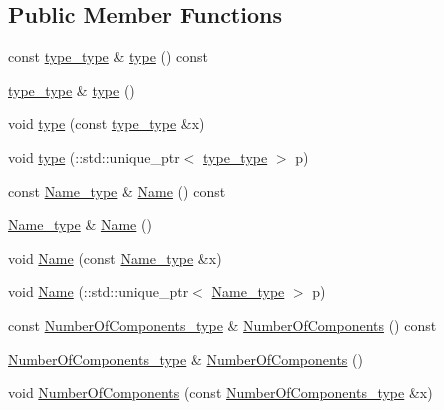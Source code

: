 \subsection*{Public Member Functions}
\begin{DoxyCompactItemize}
\item 
const \hyperlink{classDataArray__t_a484a0509e4f141d9970d75881703a51e}{type\+\_\+type} \& \hyperlink{classDataArray__t_a6ec3c246d1a2fddc7052bcde2cb6bdf7}{type} () const 
\item 
\hyperlink{classDataArray__t_a484a0509e4f141d9970d75881703a51e}{type\+\_\+type} \& \hyperlink{classDataArray__t_a29f3ed42a5bf8df9437ece5f63c02301}{type} ()
\item 
void \hyperlink{classDataArray__t_ae4fd6c47e992055ec42cc1949b60da2a}{type} (const \hyperlink{classDataArray__t_a484a0509e4f141d9970d75881703a51e}{type\+\_\+type} \&x)
\item 
void \hyperlink{classDataArray__t_a271b76368e9e5331b27c896a7ce9dda7}{type} (\+::std\+::unique\+\_\+ptr$<$ \hyperlink{classDataArray__t_a484a0509e4f141d9970d75881703a51e}{type\+\_\+type} $>$ p)
\item 
const \hyperlink{classDataArray__t_afc6836923916c2489f91caea78ec4ad6}{Name\+\_\+type} \& \hyperlink{classDataArray__t_ada03ebff820f73d64d0761a0fb977527}{Name} () const 
\item 
\hyperlink{classDataArray__t_afc6836923916c2489f91caea78ec4ad6}{Name\+\_\+type} \& \hyperlink{classDataArray__t_aeb126f8a8b03eea44eed5a2b606da59c}{Name} ()
\item 
void \hyperlink{classDataArray__t_a95a1f49a6dd9f54fb71fb6b70240a51b}{Name} (const \hyperlink{classDataArray__t_afc6836923916c2489f91caea78ec4ad6}{Name\+\_\+type} \&x)
\item 
void \hyperlink{classDataArray__t_add3007d3bd0cecaf0800c20c297373ec}{Name} (\+::std\+::unique\+\_\+ptr$<$ \hyperlink{classDataArray__t_afc6836923916c2489f91caea78ec4ad6}{Name\+\_\+type} $>$ p)
\item 
const \hyperlink{classDataArray__t_aac602cec132f6e771f7fa3be1d19c16f}{Number\+Of\+Components\+\_\+type} \& \hyperlink{classDataArray__t_a715a5b58a694d49499591bfea3a282ae}{Number\+Of\+Components} () const 
\item 
\hyperlink{classDataArray__t_aac602cec132f6e771f7fa3be1d19c16f}{Number\+Of\+Components\+\_\+type} \& \hyperlink{classDataArray__t_a6f80fc5ce05d51d4292c698464d4ace3}{Number\+Of\+Components} ()
\item 
void \hyperlink{classDataArray__t_a755fae9b31318f98a3d21beba16f2841}{Number\+Of\+Components} (const \hyperlink{classDataArray__t_aac602cec132f6e771f7fa3be1d19c16f}{Number\+Of\+Components\+\_\+type} \&x)

\end{DoxyCompactItemize}

